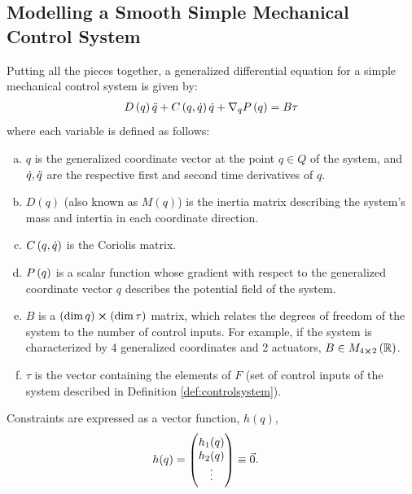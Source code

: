 \documentclass[main.tex]{subfiles}
\begin{document}

\subsection{Modelling a Smooth Simple Mechanical Control System}
Putting all the pieces together, a generalized differential equation for a simple mechanical control system is given by:
\begin{align}
    D\del{ q}\qdd+C\del{ q,\qd}\qd+\nabla_qP\del{ q}=B\tau\label{control-equation}
\end{align}
where each variable is defined as follows:%
\begin{enumerate}[(a)]
    \item $q$ is the generalized coordinate vector at the point $q\in Q$ of the system, and $\dot q,\ddot q$ are the respective first and second time derivatives of $q$.
    \item $D(q)$ (also known as $M(q)$) is the inertia matrix describing the system's mass and intertia in each coordinate direction.
    \item $C\del{q,\qd}$ is the Coriolis matrix.
    \item $P\del{q}$ is a scalar function whose gradient with respect to the generalized coordinate vector $q$ describes the potential field of the system.
    \item $B$ is a $\del{\dim q }\cross\del{ \dim \tau}$ matrix, which relates the degrees of freedom of the system to the number of control inputs. For example, if the system is characterized by 4 generalized coordinates and 2 actuators, $B\in M_{4\cross 2}\del{\ree}$.
    \item $\tau$ is the vector containing the elements of $F$ (set of control inputs of the system described in Definition \ref{def:controlsystem}).
\end{enumerate}
Constraints are expressed as a vector function, ${h}(q)$,
    \begin{align}
        {h}(q)&=\pmqty{h_1(q)\\h_2(q)\\\vdots}\equiv \vec{0}.
    \end{align}
\end{document}
